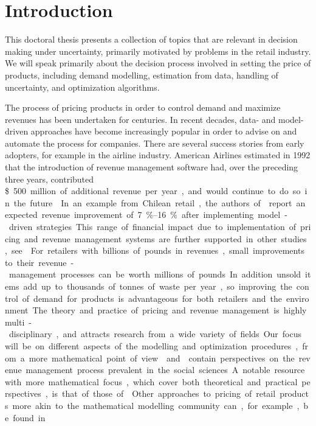 \documentclass[main.tex]{subfiles}
\begin{document}
\chapter{Introduction}
This doctoral thesis presents a collection of topics that are relevant
in decision making under uncertainty, primarily motivated by
problems in the retail industry.
We will speak primarily about the decision process involved in setting the
price of products, including demand modelling, estimation from data,
handling of uncertainty, and optimization algorithms.

The process of pricing products in order to control demand and
maximize revenues has been undertaken for centuries. In recent
decades, data- and model-driven approaches have become increasingly
popular in order to advise on and automate the process for companies.
There are several success stories from early adopters, for example in
the airline industry.
American Airlines estimated in 1992 that the introduction of revenue
management software had, over the preceding three
years, contributed \SI{500}[\$] million of additional revenue per year,
and would continue to do so in the future~\cite{smith1992yield}.
In an example from Chilean retail, the authors of~\cite{bitran1998coordinating}
report an expected revenue improvement of \SIrange{7}{16}{\percent} after implementing
model-driven strategies.
This range of financial impact due to implementation of pricing and revenue
management systems are further supported in other studies, see \cite[Ch.~1.2]{phillips2005pricing}.
For retailers with billions of pounds in revenues, small
improvements to their revenue-management processes can be worth millions
of pounds.
In addition unsold items add up to thousands of tonnes of waste per year, so
improving the control of demand for products is advantageous
for both retailers and the environment.

The theory and practice of pricing and revenue management is highly
multi-disciplinary, and attracts research from a wide variety of
fields. Our focus will be on different aspects of the modelling and
optimization procedures, from a more mathematical point of view.
\citet{phillips2005pricing} and \citet{ozer2012oxford} contain perspectives on the
revenue management process prevalent in the social sciences.
A notable resource with more mathematical focus, which
cover both theoretical and practical
perspectives, is that of those of \citet{talluri2006theory}.
Other approaches to pricing of retail products more akin to the
mathematical modelling community can, for example, be found in~\cite{butler2014customer}.
\end{document}

